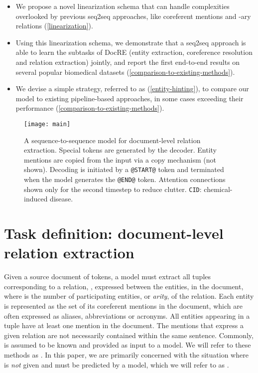 \documentclass[11pt]{article}
\begin{document}
\begin{itemize}
    \item We propose a novel linearization schema that can handle complexities overlooked by previous seq2seq approaches, like coreferent mentions and -ary relations (\textsection \ref{linearization}).
    \item Using this linearization schema, we demonstrate that a seq2seq approach is able to learn the subtasks of DocRE (entity extraction, coreference resolution and relation extraction) jointly, and report the first end-to-end results on several popular biomedical datasets (\textsection\ref{comparison-to-existing-methods}).
    \item{We devise a simple strategy, referred to as  (\textsection\ref{entity-hinting}), to compare our model to existing pipeline-based approaches, in some cases exceeding their performance (\textsection\ref{comparison-to-existing-methods}).}
\end{itemize}

\begin{figure*}[t]
\centering
\texttt{[image: main]}
\caption{A sequence-to-sequence model for document-level relation extraction. Special tokens are generated by the decoder. Entity mentions are copied from the input via a copy mechanism (not shown). Decoding is initiated by a \texttt{@START@} token and terminated when the model generates the \texttt{@END@} token. Attention connections shown only for the second timestep to reduce clutter. \texttt{CID}: chemical-induced disease.}
\label{fig:main}
\end{figure*}

\section{Task definition: document-level relation extraction}

Given a source document of  tokens, a model must extract all tuples corresponding to a relation, , expressed between the entities,  in the document,  where  is the number of participating entities, or \textit{arity}, of the relation. Each entity  is represented as the set of its coreferent mentions  in the document, which are often expressed as aliases, abbreviations or acronyms. All entities appearing in a tuple have at least one mention in the document. The mentions that express a given relation are not necessarily contained within the same sentence. Commonly,  is assumed to be known and provided as input to a model. We will refer to these methods as . In this paper, we are primarily concerned with the situation where  is \textit{not} given and must be predicted by a model, which we will refer to as .
\end{document}
